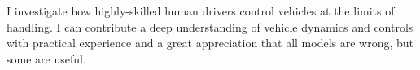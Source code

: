 
\begin{cvparagraph}
I investigate how highly-skilled human drivers control vehicles at the limits of handling.
I can contribute a deep understanding of vehicle dynamics and controls with practical experience and a great appreciation that all models are wrong, but some are useful.
\end{cvparagraph}
